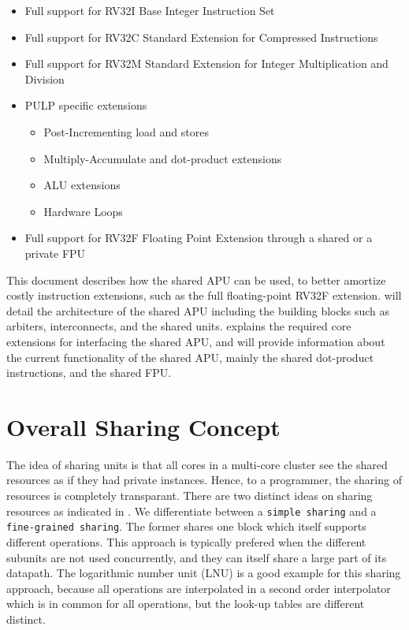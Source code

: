 \documentclass[%
 oneside,      %
 openany,      %
 halfparskip,  %
]{scrbook}
\begin{document}
\begin{itemize}
  \item Full support for RV32I Base Integer Instruction Set
  \item Full support for RV32C Standard Extension for Compressed Instructions
  \item Full support for RV32M Standard Extension for Integer Multiplication
    and Division
  \item PULP specific extensions
        \begin{itemize}
          \item Post-Incrementing load and stores
          \item Multiply-Accumulate and dot-product extensions
          \item ALU extensions
          \item Hardware Loops
        \end{itemize}
  \item Full support for RV32F Floating Point Extension through a shared or a private FPU
\end{itemize}

This document describes how the shared APU can be used, to better amortize costly instruction extensions, such as the full floating-point RV32F extension.  will detail the architecture of the shared APU including the building blocks such as arbiters, interconnects, and the shared units.  explains the required core extensions for interfacing the shared APU, and  will provide information about the current functionality of the shared APU, mainly the shared dot-product instructions, and the shared FPU.

\section{Overall Sharing Concept}
The idea of sharing units is that all cores in a multi-core cluster see the shared resources as if they had private instances. Hence, to a programmer, the sharing of resources is completely transparant.
There are two distinct ideas on sharing resources as indicated in . We differentiate between a \texttt{simple sharing} and a \texttt{fine-grained sharing}. The former shares one block which itself supports different operations. This approach is typically prefered when the different subunits are not used concurrently, and they can itself share a large part of its datapath. The logarithmic number unit (LNU) \cite{Gautschi_jssc} is a good example for this sharing approach, because all operations are interpolated in a second order interpolator which is in common for all operations, but the look-up tables are different distinct.
\end{document}

